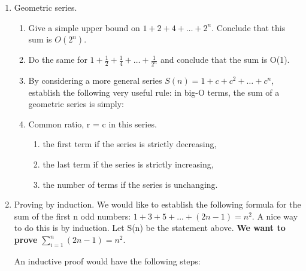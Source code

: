 \documentclass[12pt]{article}
\begin{document}
\begin{enumerate}

\item Geometric series.
\begin{enumerate}
	\item Give a simple upper bound on $1+2+4+ \dots +2^n$. Conclude that this sum is $O(2^n)$.
	\item Do the same for $1+ \frac{1}{2 }+ \frac{1}{4} + \dots + \frac{1}{2^n} $ and conclude that the sum is O(1).
	\item By considering a more general series $S(n) = 1 + c + c^2 +  \dots + c^n$, establish the following very useful rule: in big-O terms, the sum of a geometric series is simply:
		\item Common ratio, r = c in this series.
\begin{enumerate}
\item the first term if the series is strictly decreasing, 
\item  the last term if the series is strictly increasing, 
\item  the number of terms if the series is unchanging.
\end{enumerate} 
\end{enumerate} 

\item Proving by induction. We would like to establish the following formula for the sum of the first n odd numbers: $1+3+5+ ... +(2n-1) = n^2. $ A nice way to do this is by induction. Let S(n) be the statement above. \textbf{We want to prove} $\sum_{i = 1}^{n}(2n-1) = n^2.$  

An inductive proof would have the following steps:
\begin{enumerate}
	

\end{enumerate}
\end{enumerate}
\end{document}
